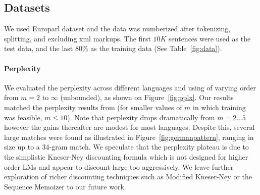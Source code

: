 
\subsection{Datasets}
We used Europarl dataset and the data was numberized after tokenizing, splitting, and excluding xml markups. The first $10K$ sentences were used as the test data, and the last 80\% as the training data (See Table~\ref{fig:data}).

\begin{table}
\caption{Tokens and sentence counts refer to the training partition. }\label{fig:data}
\end{table}

\paragraph{Perplexity}
We evaluated the perplexity across different languages and using \ngrams of varying order from $m=2$ to $\infty$ (unbounded), as shown on Figure~\ref{fig:pplx}.
Our results matched the perplexity results from \SRILM (for smaller values of $m$ in which \SRILM training was feasible, $m \le 10$).
Note that perplexity drops dramatically from $m=2\ldots5$ however the gains thereafter are modest for most languages.
Despite this, several large \ngram matches were found as illustrated in Figure~\ref{fig:germanpattern}, ranging in size up to a 34-gram match.
We speculate that the perplexity plateau is due to the simplistic Kneser-Ney discounting formula which is not designed for higher order \ngram LMs and appear to discount large \ngrams too aggressively. 
We leave further exploration of richer discounting techniques such as Modified Kneser-Ney \cite{chen_goodman} or the Sequence Memoizer \cite{wood_teh} to our future work.


